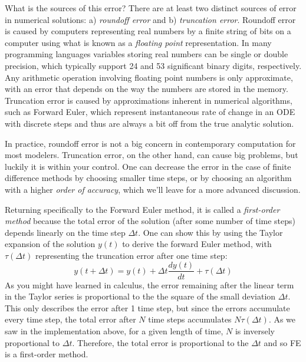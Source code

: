 \documentclass[
  letterpaper,
  DIV=11,
  numbers=noendperiod]{scrreprt}
\begin{document}
What is the sources of this error? There are at least two distinct
sources of error in numerical solutions: a)
\emph{roundoff error} and b)
\emph{truncation error}. Roundoff error is
caused by computers representing real numbers by a finite string of bits
on a computer using what is known as a
\emph{floating point}
representation. In many programming languages variables storing real
numbers can be single or double precision, which typically support 24
and 53 significant binary digits, respectively. Any arithmetic operation
involving floating point numbers is only approximate, with an error that
depends on the way the numbers are stored in the memory. Truncation
error is caused by approximations inherent in numerical algorithms, such
as Forward Euler, which represent instantaneous rate of change in an ODE
with discrete steps and thus are always a bit off from the true analytic
solution.

In practice, roundoff error is not a big concern in contemporary
computation for most modelers. Truncation error, on the other hand, can
cause big problems, but luckily it is within your control. One can
decrease the error in the case of finite difference methods by choosing
smaller time steps, or by choosing an algorithm with a higher
\emph{order of accuracy}, which we'll leave for a more advanced
discussion.

Returning specifically to the Forward Euler method, it is called a
 \emph{first-order
method} because the total error of the solution (after some number of
time steps) depends linearly on the time step \(\Delta t\). One can show
this by using the Taylor expansion of the solution \(y(t)\) to derive
the forward Euler method, with \(\tau(\Delta t)\) representing the
truncation error after one time step:
\[y(t+\Delta t) = y(t) +  \Delta t \frac {dy(t) }{dt} + \tau(\Delta t)\]
As you might have learned in calculus, the error remaining after the
linear term in the Taylor series is proportional to the the square of
the small deviation \(\Delta t\). This only describes the error after 1
time step, but since the errors accumulate every time step, the total
error after \(N\) time steps accumulates \(N \tau(\Delta t)\). As we saw
in the implementation above, for a given length of time, \(N\) is
inversely proportional to \(\Delta t\). Therefore, the total error is
proportional to the \(\Delta t\) and so FE is a first-order method.
\end{document}
